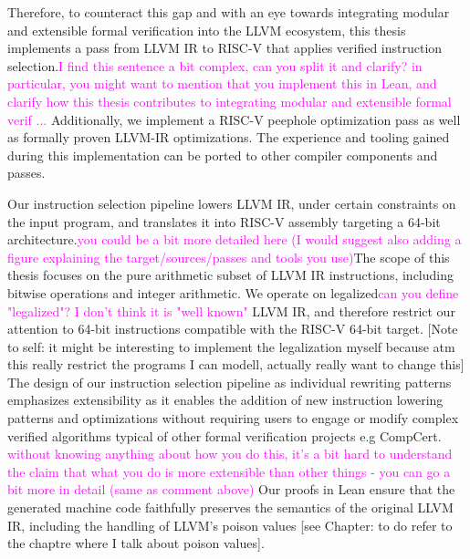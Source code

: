 Therefore, to counteract this gap and with an eye towards integrating modular and extensible formal verification into the LLVM ecosystem, this thesis implements a pass from LLVM IR to RISC-V that applies verified instruction selection.\textcolor{magenta}{I find this sentence a bit complex, can you split it and clarify? in particular, you might want to mention that you implement this in Lean, and clarify how this thesis contributes to integrating modular and extensible formal verif ...} Additionally, we implement a RISC-V peephole optimization pass as well as formally proven LLVM-IR optimizations. The experience and tooling gained during this implementation can be ported to other compiler components and passes.

Our instruction selection pipeline lowers LLVM IR, under certain constraints on the input program, and translates it into RISC-V assembly targeting a 64-bit architecture.\textcolor{magenta}{you could be a bit more detailed here (I would suggest also adding a figure explaining the target/sources/passes and tools you use)}The scope of this thesis focuses on the pure arithmetic subset of LLVM IR instructions, including bitwise operations and integer arithmetic. We operate on legalized\textcolor{magenta}{can you define "legalized"? I don't think it is "well known"} LLVM IR, and therefore restrict our attention to 64-bit instructions compatible with the RISC-V 64-bit target.
[Note to self: it might be interesting to implement the legalization myself because atm this really restrict the programs I can modell, actually really want to change this]
The design of our instruction selection pipeline as individual rewriting patterns emphasizes extensibility as it enables the addition of new instruction lowering patterns and optimizations without requiring users to engage or modify complex verified algorithms typical of other formal verification projects e.g CompCert. \textcolor{magenta}{without knowing anything about how you do this, it's a bit hard to understand the claim that what you do is more extensible than other things - you can go a bit more in detail (same as comment above)}
Our proofs in Lean ensure that the generated machine code faithfully preserves the semantics of the original LLVM IR, including the handling of LLVM’s poison values [see Chapter: to do refer to the chaptre where I talk about poison values].

